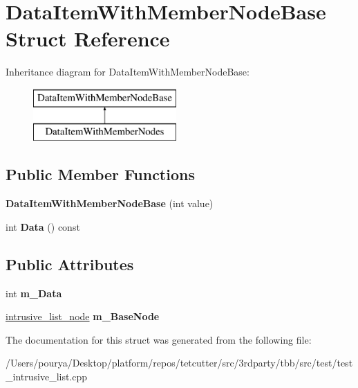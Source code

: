 \hypertarget{structDataItemWithMemberNodeBase}{}\section{Data\+Item\+With\+Member\+Node\+Base Struct Reference}
\label{structDataItemWithMemberNodeBase}
Inheritance diagram for Data\+Item\+With\+Member\+Node\+Base\+:\begin{figure}[H]
\begin{center}
\leavevmode
\includegraphics[height=2.000000cm]{structDataItemWithMemberNodeBase}
\end{center}
\end{figure}
\subsection*{Public Member Functions}
\begin{DoxyCompactItemize}
\item 
\hypertarget{structDataItemWithMemberNodeBase_a117c8e1d28dcab23ae383dc2cfc084f8}{}{\bfseries Data\+Item\+With\+Member\+Node\+Base} (int value)\label{structDataItemWithMemberNodeBase_a117c8e1d28dcab23ae383dc2cfc084f8}

\item 
\hypertarget{structDataItemWithMemberNodeBase_ac3fbbffb92dd2517f81c16e134858946}{}int {\bfseries Data} () const \label{structDataItemWithMemberNodeBase_ac3fbbffb92dd2517f81c16e134858946}

\end{DoxyCompactItemize}
\subsection*{Public Attributes}
\begin{DoxyCompactItemize}
\item 
\hypertarget{structDataItemWithMemberNodeBase_a1ae79e696e697d44ecb250cf88ea3f70}{}int {\bfseries m\+\_\+\+Data}\label{structDataItemWithMemberNodeBase_a1ae79e696e697d44ecb250cf88ea3f70}

\item 
\hypertarget{structDataItemWithMemberNodeBase_a64f7d49818d5b9a5e16b2e5fcf025693}{}\hyperlink{structtbb_1_1internal_1_1intrusive__list__node}{intrusive\+\_\+list\+\_\+node} {\bfseries m\+\_\+\+Base\+Node}\label{structDataItemWithMemberNodeBase_a64f7d49818d5b9a5e16b2e5fcf025693}

\end{DoxyCompactItemize}


The documentation for this struct was generated from the following file\+:\begin{DoxyCompactItemize}
\item 
/\+Users/pourya/\+Desktop/platform/repos/tetcutter/src/3rdparty/tbb/src/test/test\+\_\+intrusive\+\_\+list.\+cpp\end{DoxyCompactItemize}
